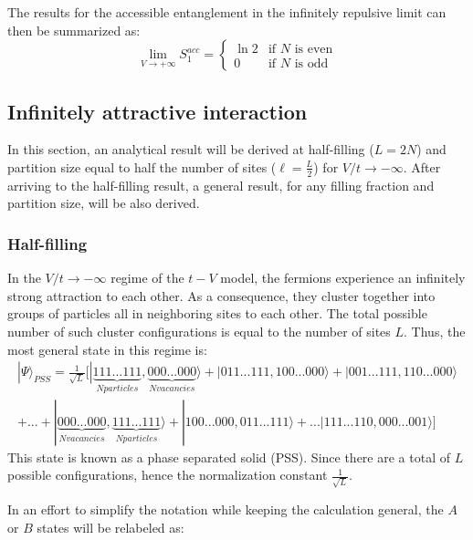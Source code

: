The results for the accessible entanglement in the infinitely repulsive limit can then be summarized as:
%
\begin{equation}
\lim_{V \to + \infty} S_{1}^{acc} =
\begin{cases}
\ln{2}  & \text{if }N\text{ is even} \\
0 & \text{if }N\text{ is odd}
\end{cases}
\end{equation}
%

	\subsection{Infinitely attractive interaction}
	In this section, an analytical result will be derived at half-filling ($L = 2N$) and partition size equal to half the number of sites ($\ell = \frac{L}{2}$) for $V/t \to - \infty$. After arriving to the half-filling result, a general result, for any filling fraction and partition size, will be also derived. 
	
	\subsubsection{Half-filling}
	In the $V/t \to -\infty$ regime of the $t-V$ model, the fermions experience an infinitely strong attraction to each other. As a consequence, they cluster together into groups of particles all in neighboring sites to each other. The total possible number of such cluster configurations is equal to the number of sites $L$. Thus, the most general state in this regime is:
%
\begin{equation}
\begin{aligned}	
| \Psi \rangle_{PSS} = \frac{1}{\sqrt{L}} [ | \underbrace{111...111}_{N particles} , \underbrace{000...000}_{N vacancies} \rangle + |011...111, 100...000 \rangle + |001...111, 110...000 \rangle  \\
+ ...  + |\underbrace{000...000}_{N vacancies}, \underbrace{111...111}_{N particles} \rangle + |100...000, 011...111 \rangle + ... |111...110, 000...001 \rangle ]
\end{aligned}
\end{equation}
%
This state is known as a phase separated solid (PSS). Since there are a total of $L$ possible configurations, hence the normalization constant $\frac{1}{\sqrt{L}}$. 

In an effort to simplify the notation while keeping the calculation general, the $A$ or $B$ states will be relabeled as:

